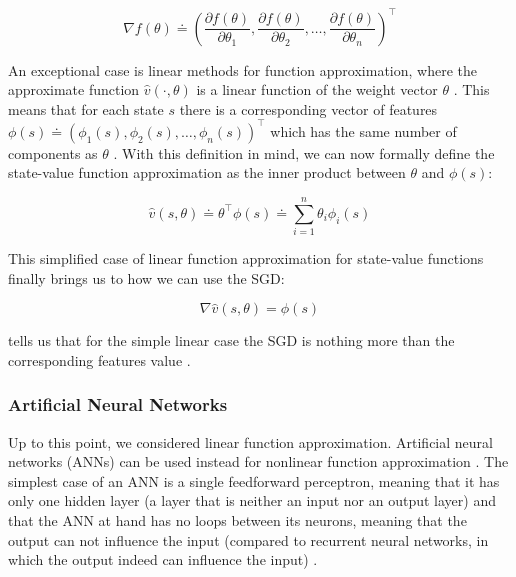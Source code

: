 \documentclass{seal_thesis}
\begin{document}
\begin{equation}
	\nabla f(\theta) \doteq \left( \frac{\partial f(\theta)}{\partial \theta_1}, \frac{\partial f(\theta)}{\partial \theta_2}, \ldots, \frac{\partial f(\theta)}{\partial \theta_n} \right)^\top
\end{equation}


An exceptional case is linear methods for function approximation, where the approximate function $\hat{v} (\cdot ,\theta)$ is a linear function of the weight vector $\theta$ \cite[p. 198]{Sutton2017}. This means that for each state $s$ there is a corresponding vector of features $\phi (s) \doteq \left( \phi_1 (s), \phi_2 (s), \ldots, \phi_n (s) \right)^\top$ which has the same number of components as $\theta$ \cite[p. 198]{Sutton2017}. With this definition in mind, we can now formally define the state-value function approximation as the inner product between $\theta$ and $\phi (s)$:

\begin{equation}
\label{eq:function_approximation_dot}
	\hat{v} (s,\theta) \doteq \theta^\top \phi (s) \doteq \sum_{i=1}^n \theta_i \phi_i (s)
\end{equation}

This simplified case of linear function approximation for state-value functions finally brings us to how we can use the SGD:

\begin{equation}
\label{eq:sgd_linear}
	\nabla \hat{v} (s,\theta) = \phi (s)
\end{equation}

 tells us that for the simple linear case the SGD is nothing more than the corresponding features value  \cite[p. 199]{Sutton2017}.

\subsubsection{Artificial Neural Networks}

Up to this point, we considered linear function approximation. Artificial neural networks (ANNs) can be used instead for nonlinear function approximation \cite[p. 199]{Sutton2017}. The simplest case of an ANN is a single feedforward perceptron, meaning that it has only one hidden layer (\ie a layer that is neither an input nor an output layer) and that the ANN at hand has no loops between its neurons, meaning that the output can not influence the input (compared to recurrent neural networks, in which the output indeed can influence the input) \cite[p. 216]{Sutton2017}. 
\end{document}
